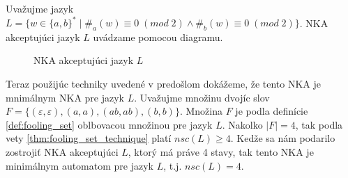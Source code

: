 \begin{example}
\normalfont Uvažujme jazyk $ L = \lbrace w \in \lbrace a,b \rbrace^* \; | \; \#_a(w) \equiv 0 \; (mod \; 2) \wedge \#_b(w) \equiv 0 \; (mod \; 2) \rbrace $. NKA akceptujúci jazyk $ L $ uvádzame pomocou diagramu.

\begin{figure}[H]
\centering
{}

\caption{NKA akceptujúci jazyk $ L $}
\end{figure}
Teraz použijúc techniky uvedené v predošlom dokážeme, že tento NKA je mnimálnym NKA pre jazyk $ L $. Uvažujme množinu dvojíc slov $ F = \lbrace (\varepsilon, \varepsilon), (a,a), (ab,ab),(b,b) \rbrace $. Množina $ F $ je podla definície \ref{def:fooling_set} oblbovacou množinou pre jazyk $ L $. Nakolko $ |F| = 4 $, tak podla vety \ref{thm:fooling_set_technique} platí $ nsc(L) \geq 4 $. Kedže sa nám podarilo zostrojiť NKA akceptujúci $ L $, ktorý má práve 4 stavy, tak tento NKA je minimálnym automatom pre jazyk $ L $, t.j. $ nsc(L) = 4 $.
\end{example}

